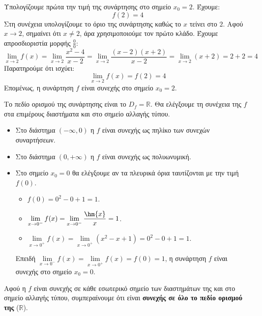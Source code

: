 
\lysh
Υπολογίζουμε πρώτα την τιμή της συνάρτησης στο σημείο $x_0 = 2$. Έχουμε:
\[ f(2) = 4 \]
Στη συνέχεια υπολογίζουμε το όριο της συνάρτησης καθώς το $x$ τείνει στο $2$. Αφού $x \to 2$, σημαίνει ότι $x \neq 2$, άρα χρησιμοποιούμε τον πρώτο κλάδο. Έχουμε απροσδιοριστία μορφής $\frac{0}{0}$:
\[ \lim\limits_{x\to 2} f(x) = \lim\limits_{x\to 2} \dfrac{x^2-4}{x-2} = \lim\limits_{x\to 2} \dfrac{(x-2)(x+2)}{x-2} = \lim\limits_{x\to 2} (x+2) = 2+2 = 4 \]
Παρατηρούμε ότι ισχύει:
\[ \lim\limits_{x\to 2} f(x) = f(2) = 4 \]
Επομένως, η συνάρτηση $f$ είναι συνεχής στο σημείο $x_0 = 2$.


\lysh
Το πεδίο ορισμού της συνάρτησης είναι το $D_f = \mathbb{R}$. Θα ελέγξουμε τη συνέχεια της $f$ στα επιμέρους διαστήματα και στο σημείο αλλαγής τύπου.
\begin{itemize}
\item Στο διάστημα $(-\infty, 0)$ η $f$ είναι συνεχής ως πηλίκο των συνεχών συναρτήσεων.
\item Στο διάστημα $(0, +\infty)$ η $f$ είναι συνεχής ως πολυωνυμική.
\item Στο σημείο $x_0 = 0$ θα ελέγξουμε αν τα πλευρικά όρια ταυτίζονται με την τιμή $f(0)$.
\begin{itemize}
    \item $f(0) = 0^2 - 0 + 1 = 1$.
    \item $\displaystyle \lim\limits_{x\to 0^-} f(x) = \lim\limits_{x\to 0^-} \dfrac{\hm{x}}{x} = 1$.
    \item $\displaystyle \lim\limits_{x\to 0^+} f(x) = \lim\limits_{x\to 0^+} (x^2 - x + 1) = 0^2 - 0 + 1 = 1$.
\end{itemize}
Επειδή $\displaystyle \lim\limits_{x\to 0^-} f(x) = \lim\limits_{x\to 0^+} f(x) = f(0) = 1$, η συνάρτηση $f$ είναι συνεχής στο σημείο $x_0=0$.
\end{itemize}
Αφού η $f$ είναι συνεχής σε κάθε εσωτερικό σημείο των διαστημάτων της και στο σημείο αλλαγής τύπου, συμπεραίνουμε ότι είναι \textbf{συνεχής σε όλο το πεδίο ορισμού της} ($\mathbb{R}$).
